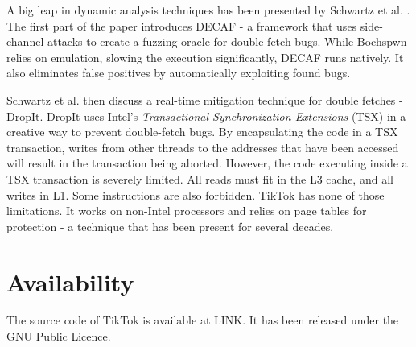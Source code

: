 A big leap in dynamic analysis techniques has been presented by Schwartz et al.
\cite{schwarz2018automated}. The first part of the paper introduces DECAF - a
framework that uses side-channel attacks to create a fuzzing oracle for
double-fetch bugs. While Bochspwn relies on emulation, slowing the execution
significantly, DECAF runs natively. It also eliminates false positives by
automatically exploiting found bugs.

Schwartz et al. then discuss a real-time mitigation technique for double
fetches - DropIt. DropIt uses Intel's \emph{Transactional Synchronization 
Extensions} (TSX)\cite{intel64and} in a creative way to prevent double-fetch
bugs. By encapsulating the code in a TSX transaction, writes from other threads
to the addresses that have been accessed will result in the
transaction being aborted. However, the code executing inside a TSX transaction
is severely limited. All reads must fit in the L3 cache, and all writes in L1.
Some instructions are also forbidden. TikTok has none of those limitations.
It works on non-Intel processors and relies on page tables for protection - a
technique that has been present for several decades.



\section*{Availability}

The source code of TikTok is available at LINK. It has been released under the
GNU Public Licence.






